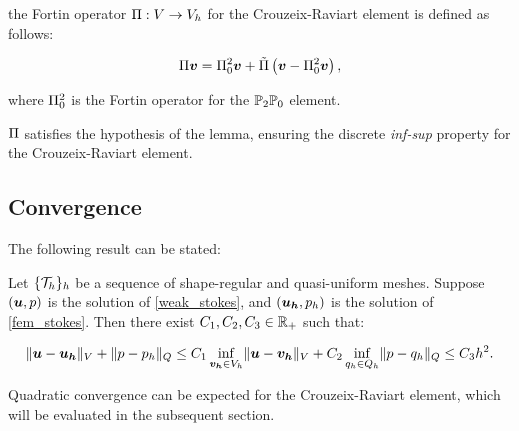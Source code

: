 the Fortin operator $\Pi: V \rightarrow V_h$ for the Crouzeix-Raviart element is defined as follows:

\begin{gather}
    \Pi \bm{v} = \Pi^2_0 \bm{v} + \tilde{\Pi} \left( \bm{v} - \Pi^2_0 \bm{v}\right),
\end{gather}

where $\Pi^2_0$ is the Fortin operator for the $\mathbb{P}_{2}\mathbb{P}_{0}$ element.

$\Pi$ satisfies the hypothesis of the  lemma, ensuring the discrete \textit{inf-sup} property for the Crouzeix-Raviart element.

\subsection{Convergence}

The following result can be stated:

\begin{proposition} \label{convergence}
    Let $\{\mathcal{T}_h\}_h$ be a sequence of shape-regular and quasi-uniform meshes. Suppose $(\bm{u}, p)$ is the solution of \eqref{weak_stokes}, and $(\bm{u_h}, p_h)$ is the solution of \eqref{fem_stokes}. Then there exist $C_1, C_2, C_3 \in \mathbb{R}_+$ such that:

    \begin{gather}
        \lVert \bm{u} - \bm{u_h} \rVert_V + \lVert p - p_h \rVert_Q \leq C_1 \inf_{\bm{v_h} \in V_h} \lVert \bm{u} - \bm{v_h} \rVert_V + C_2 \inf_{q_h \in Q_h} \lVert p - q_h \rVert_Q \leq C_3 h^2.
    \end{gather}
\end{proposition}

Quadratic convergence can be expected for the Crouzeix-Raviart element, which will be evaluated in the subsequent section.